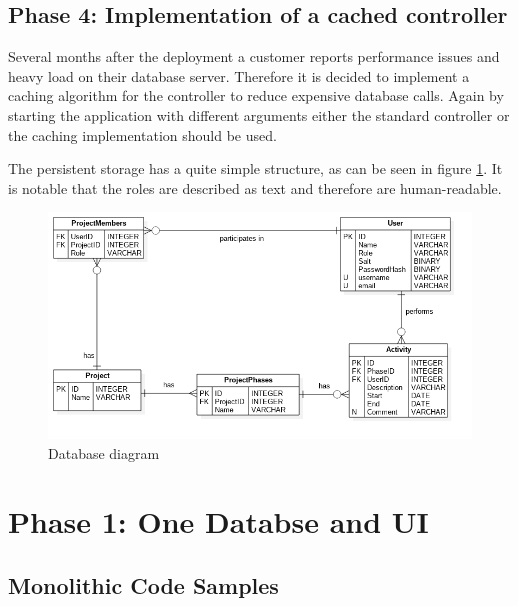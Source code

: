 \subsection{Phase 4: Implementation of a cached controller}
Several months after the deployment a customer reports performance issues and heavy load on their database server. Therefore it is decided to implement a caching algorithm for the controller to reduce expensive database calls. Again by starting the application with different arguments either the standard controller or the caching implementation should be used.


The persistent storage has a quite simple structure, as can be seen in figure \ref{fig:database}. It is notable that the roles are described as text and therefore are human-readable. 
\begin{figure}[htbp]
\includegraphics[width=\textwidth]{./content/pictures/database.png}
\caption{Database diagram}
\label{fig:database}
\end{figure}

\clearpage

\section{Phase 1: One Databse and UI}
\subsection{Monolithic Code Samples}

